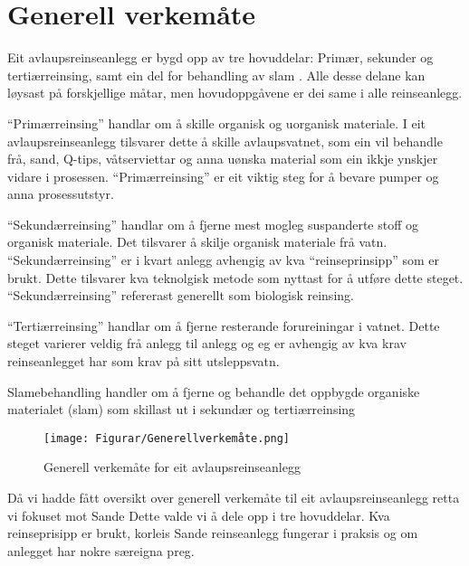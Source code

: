 \section{Generell verkemåte}

Eit avlaupsreinseanlegg er bygd opp av tre hovuddelar: Primær, sekunder og tertiærreinsing,
samt ein del for behandling av slam \citep{Regjeriga}.
Alle desse delane kan løysast på forskjellige måtar, men hovudoppgåvene er dei same
i alle reinseanlegg.

``Primærreinsing'' handlar om å skille organisk og uorganisk materiale.
I eit avlaupsreinseanlegg tilsvarer dette å skille avlaupsvatnet, 
som ein vil behandle frå, sand, Q-tips, våtserviettar
og anna uønska material som ein ikkje ynskjer vidare i prosessen.\newline
``Primærreinsing'' er eit viktig steg for å bevare pumper og anna prosessutstyr.

``Sekundærreinsing'' handlar om å fjerne mest mogleg suspanderte stoff og organisk materiale.
Det tilsvarer å skilje organisk materiale frå vatn.
``Sekundærreinsing'' er i kvart anlegg avhengig av kva ``reinseprinsipp'' som er brukt. Dette tilsvarer
kva teknolgisk metode som nyttast for å utføre dette steget.
``Sekundærreinsing'' refererast generellt som biologisk reinsing.

``Tertiærreinsing'' handlar om å fjerne resterande forureiningar i vatnet.
Dette steget varierer veldig frå anlegg til anlegg og eg er
avhengig av kva krav reinseanlegget har som krav på sitt utsleppsvatn.

Slamebehandling handler om å fjerne og behandle det oppbygde organiske materialet (slam)
som skillast ut i sekundær og tertiærreinsing 

\begin{figure}[htbp]
    \centering
    \texttt{[image: Figurar/Generellverkemåte.png]}
    \caption{Generell verkemåte for eit avlaupsreinseanlegg}\label{fig:GenerellVerkemåte}
\end{figure}

Då vi hadde fått oversikt over generell verkemåte til eit avlaupsreinseanlegg retta vi fokuset mot Sande
Dette valde vi å dele opp i tre hovuddelar. Kva reinseprisipp er brukt, korleis Sande reinseanlegg
fungerar i praksis og om anlegget har nokre særeigna preg.
